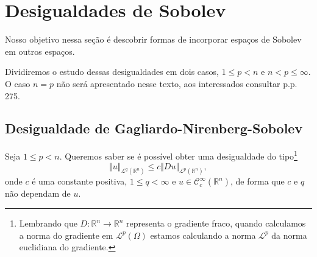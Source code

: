\documentclass[a4paper, 11pt]{book}
\theoremstyle{definition}
\newcommand{\bR}{\mathbb{R}}
\newcommand{\cC}{\mathcal{C}}
\newcommand{\cL}{\mathcal{L}}
\begin{document}
\section{Desigualdades de Sobolev}

Nosso objetivo nessa seção é descobrir formas de incorporar espaços de Sobolev em outros espaços.

Dividiremos o estudo dessas desigualdades em dois casos, $1 \leqslant p < n$ e $n < p \leqslant \infty$.
O caso $n = p$ não será apresentado nesse texto, aos interessados consultar \cite{evans-pde} p.p. 275.

\subsection{Desigualdade de Gagliardo-Nirenberg-Sobolev}

Seja $1 \leqslant p < n$.
Queremos saber se é possível obter uma desigualdade do tipo\footnote{
    Lembrando que $D : \bR^n \to \bR^n$ representa o gradiente fraco, quando calculamos a norma do gradiente em $\cL^p(\Omega)$ estamos calculando a norma $\cL^p$ da norma euclidiana do gradiente.
}
\begin{equation} \label{eq:quase-gns}
    \Vert u \Vert_{\cL^q(\bR^n)} \leqslant c \Vert Du \Vert_{\cL^p(\bR^n)},
\end{equation}
onde $c$ é uma constante positiva, $1 \leqslant q < \infty$ e $u \in \cC^\infty_c(\bR^n)$, de forma que $c$ e $q$ não dependam de $u$.
\end{document}
